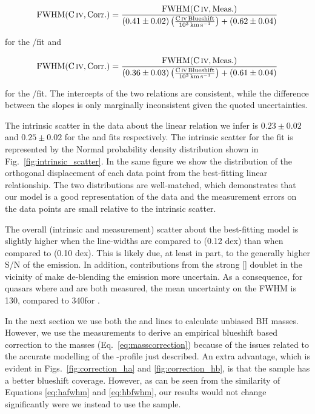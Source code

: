 \begin{equation}
    \label{eq:hafwhm}
    \rm{FWHM}(\rm{C}\,\textsc{iv}, \rm{Corr.}) = \frac{\rm{FWHM}(\rm{C}\,\textsc{iv}, \rm{Meas.})}{ (0.41\pm0.02) \left(\frac{\rm{C}\,\textsc{iv}\, Blueshift}{10^3 {\rm \,km\,s^{-1}}} \right) + (0.62\pm0.04)}
\end{equation}

\noindent for the /\ha fit and 

\begin{equation}
    \label{eq:hbfwhm}
    \rm{FWHM}(\rm{C}\,\textsc{iv}, \rm{Corr.}) = \frac{\rm{FWHM}(\rm{C}\,\textsc{iv}, \rm{Meas.})}{ (0.36\pm0.03) \left(\frac{\rm{C}\,\textsc{iv}\, Blueshift}{10^3 {\rm \,km\,s^{-1}}} \right) + (0.61\pm0.04)}
\end{equation}

\noindent for the /\hb fit. 
The intercepts of the two relations are consistent, while the difference between the slopes is only marginally inconsistent given the quoted uncertainties. 

The intrinsic scatter in the data about the linear relation we infer is $0.23 \pm 0.02$ and $0.25 \pm 0.02$ for the \ha and \hb fits respectively. 
The intrinsic scatter for the \ha fit is represented by the Normal probability density distribution shown in Fig.~\ref{fig:intrinsic_scatter}. 
In the same figure we show the distribution of the orthogonal displacement of each data point from the best-fitting linear relationship. 
The two distributions are well-matched, which demonstrates that our model is a good representation of the data and the measurement errors on the data points are small relative to the intrinsic scatter.    

The overall (intrinsic and measurement) scatter about the best-fitting model is slightly higher when the  line-widths are compared to \hb (0.12 dex) than when compared to \ha (0.10 dex). 
This is likely due, at least in part, to the generally higher S/N of the \ha emission. 
In addition, contributions from the strong [] doublet in the vicinity of \hb make de-blending the \hb emission more uncertain. 
As a consequence, for quasars where \ha and \hb are both measured, the mean uncertainty on the \ha FWHM is 130\kms, compared to 340\kms for \hbns. 

In the next section we use both the \ha and \hb lines to calculate unbiased BH masses. 
However, we use the \ha measurements to derive an empirical  blueshift based correction to the  masses (Eq.~\ref{eq:masscorrection}) because of the issues related to the accurate modelling of the \hbns-profile just described.  
An extra advantage, which is evident in Figs.~\ref{fig:correction_ha} and \ref{fig:correction_hb}, is that the \ha sample has a better  blueshift coverage. 
However, as can be seen from the similarity of Equations \ref{eq:hafwhm} and \ref{eq:hbfwhm}, our results would not change significantly were we instead to use the \hb sample. 

